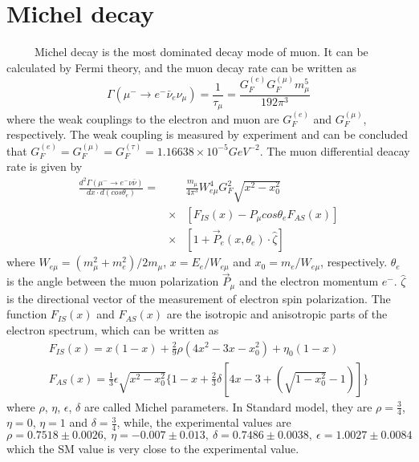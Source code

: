 \chapter{Michel decay}
~~~~~Michel decay is the most dominated decay mode of muon.
It can be calculated by Fermi theory, and the muon decay rate can be written as
\begin{equation}
 \Gamma (\mu^- \rightarrow e^- \bar \nu_e \nu_\mu) = \frac{1}{\tau_\mu} = \frac{G_F^{(e)} G_F^{(\mu)} m_\mu^5}{192 \pi^3}
\end{equation}
where the weak couplings to the electron and muon are $G_F^{(e)}$ and $G_F^{(\mu)}$, respectively.
The weak coupling is measured by experiment and can be concluded that $G_F^{(e)} = G_F^{(\mu)} = G_F^{(\tau)} = 1.16638\times10^{-5} GeV^{-2}$. 
The muon differential deacay rate is given by~\cite{kuno}
\begin{eqnarray*}
 \frac{d^2 \Gamma (\mu^-\rightarrow e^-\nu\bar\nu)}{dx \cdot d(cos\theta_e)} = &&\frac{m_\mu}{4\pi^3} W^4_{e\mu}G^2_F\sqrt{x^2-x^2_0} \\
 &\times&[F_{IS}(x)-P_\mu cos\theta_e F_{AS}(x)] \\
 &\times&[1 + \vec{P}_e(x, \theta_e) \cdot \hat{\zeta}]
\end{eqnarray*}
where $W_{e\mu} = (m_\mu^2+m_e^2)/2m_\mu$, $x = E_e/W_{e\mu}$ and $x_0 = m_e/W_{e\mu}$, respectively.
$\theta_e$ is the angle between the muon polarization $\vec{P}_\mu$ and the electron momentum $e^-$.
$\hat{\zeta}$ is the directional vector of the measurement of electron spin polarization.
The function $F_{IS}(x)$ and $F_{AS}(x)$ are the isotropic and anisotropic parts of the electron spectrum, which can be written as
\begin{gather}
 F_{IS}(x) = x(1-x) + \frac{2}{9}\rho(4x^2-3x-x_0^2) + \eta_0(1-x) \\
 F_{AS}(x) = \frac{1}{3}\epsilon\sqrt{x^2-x_0^2}\{1-x+\frac{2}{3}\delta [4x-3+(\sqrt{1-x_0^2}-1)]\}
\end{gather}
where $\rho$, $\eta$, $\epsilon$, $\delta$ are called Michel parameters.
In Standard model, they are $\rho = \frac{3}{4}$, $\eta = 0$, $\eta = 1$ and $\delta = \frac{3}{4}$, while, the experimental values are
\begin{equation}
 \rho = 0.7518\pm0.0026,~\eta = -0.007\pm0.013,~\delta = 0.7486\pm0.0038,~\epsilon = 1.0027\pm0.0084
\end{equation}
which the SM value is very close to the experimental value.

